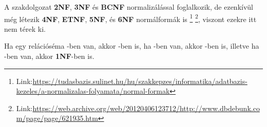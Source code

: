 \begin{megj}
A szakdolgozat \textbf{2NF}, \textbf{3NF} és \textbf{BCNF} normalizálással foglalkozik, de ezenkívül még létezik \textbf{4NF}, \textbf{ETNF}, \textbf{5NF}, és \textbf{6NF} normálformák is
\footnote{Link:\href{https://tudasbazis.sulinet.hu/hu/szakkepzes/informatika/adatbazis-kezeles/a-normalizalas-folyamata/normal-formak}{https://tudasbazis.sulinet.hu/hu/szakkepzes/informatika/adatbazis-kezeles/a-normalizalas-folyamata/normal-formak}}
\footnote{Link:\href{https://web.archive.org/web/20120406123712/http://www.dbdebunk.com/page/page/621935.htm}{https://web.archive.org/web/20120406123712/http://www.dbdebunk.com/page/page/621935.htm}}, viszont ezekre itt nem térek ki.
\end{megj}

\begin{tet}
Ha egy relációséma \BCNF-ben van, akkor \nfh-ben is, ha \nfh-ben van, akkor \nfk -ben is, illetve ha \nfk-ben van, akkor \textbf{1NF}-ben is. 
\end{tet}

